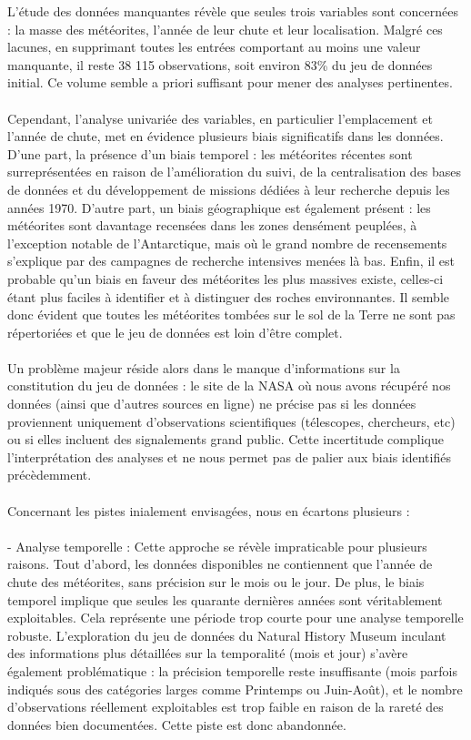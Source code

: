 \documentclass[12pt]{article}
\begin{document}
L’étude des données manquantes révèle que seules trois variables sont concernées : la masse des météorites, l’année de leur chute et leur localisation. Malgré ces lacunes, en supprimant toutes les entrées comportant au moins une valeur manquante, il reste 38 115 observations, soit environ 83\% du jeu de données initial. Ce volume semble a priori suffisant pour mener des analyses pertinentes.\\
\\
Cependant, l’analyse univariée des variables, en particulier l’emplacement et l’année de chute,  met en évidence plusieurs biais significatifs dans les données. D’une part, la présence d'un biais temporel : les météorites récentes sont surreprésentées en raison de l’amélioration du suivi, de la centralisation des bases de données et du développement de missions dédiées à leur recherche depuis les années 1970. D’autre part, un biais géographique est également présent : les météorites sont davantage recensées dans les zones densément peuplées, à l’exception notable de l’Antarctique, mais où  le grand nombre de recensements s'explique par des campagnes de recherche intensives menées là bas. Enfin, il est probable qu’un biais en faveur des météorites les plus massives existe, celles-ci étant plus faciles à identifier et à distinguer des roches environnantes. Il semble donc évident que toutes les météorites tombées sur le sol de la Terre ne sont pas répertoriées et que le jeu de données est loin d'être complet.\\
\\
Un problème majeur réside alors dans le manque d’informations sur la constitution du jeu de données : le site de la NASA où nous avons récupéré nos données (ainsi que d’autres sources en ligne) ne précise pas si les données proviennent uniquement d’observations scientifiques (télescopes, chercheurs, etc) ou si elles incluent des signalements grand public. Cette incertitude complique l’interprétation des analyses et ne nous permet pas de palier aux biais identifiés précèdemment.\\
\\
Concernant les pistes inialement envisagées, nous en écartons plusieurs :\\
\\
 - Analyse temporelle : Cette approche se révèle impraticable pour plusieurs raisons. Tout d’abord, les données disponibles ne contiennent que l’année de chute des météorites, sans précision sur le mois ou le jour. De plus, le biais temporel implique que seules les quarante dernières années sont véritablement exploitables. Cela représente une période trop courte pour une analyse temporelle robuste. L'exploration du jeu de données du Natural History Museum \cite{MetCat} inculant des informations plus détaillées sur la temporalité (mois et jour) s'avère également problématique : la précision temporelle reste insuffisante (mois parfois indiqués sous des catégories larges comme Printemps ou Juin-Août), et le nombre d’observations réellement exploitables est trop faible en raison de la rareté des données bien documentées. Cette piste est donc abandonnée.\\
\end{document}
